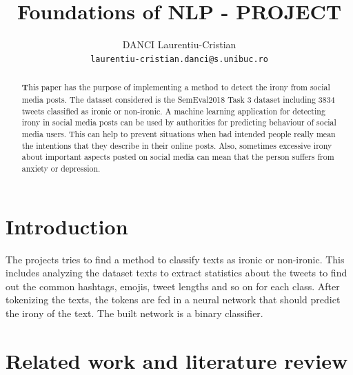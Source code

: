 \documentclass[11pt]{article}
\title{\\Foundations of NLP - PROJECT \\}
\author{DANCI Laurentiu-Cristian \\
  \texttt{laurentiu-cristian.danci@s.unibuc.ro}}
\begin{document}
\maketitle
\begin{abstract}
\textbf This paper has the purpose of implementing a method to detect the irony from social media posts.
The dataset considered is the SemEval2018 Task 3 dataset including 3834 tweets classified as ironic or non-ironic.
  A machine learning application for detecting irony in social media posts can be used by authorities for predicting behaviour of social media users.
  This can help to prevent situations when bad intended people really mean the intentions that they describe in their online posts.
    Also, sometimes excessive irony about important aspects posted on social media can mean that the person suffers from anxiety or depression.
\end{abstract}

\section{Introduction}
\label{sec:intro}

The projects tries to find a method to classify texts as ironic or non-ironic.
This includes analyzing the dataset texts to extract statistics about the tweets to find out the common hashtags, emojis, tweet lengths and so on for each class.
After tokenizing the texts, the tokens are fed in a neural network that should predict the irony of the text.
The built network is a binary classifier.

\section{Related work and literature review}
\label{sec:related-work-and-literature-review}
\end{document}
